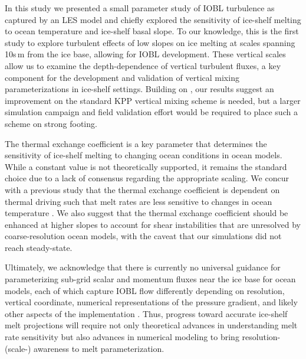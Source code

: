\documentclass[tc, manuscript]{copernicus}
\begin{document}
\conclusions

In this study we presented a small parameter study of IOBL turbulence as captured by an LES model and chiefly explored the sensitivity of ice-shelf melting to ocean temperature and ice-shelf basal slope. To our knowledge, this is the first study to explore turbulent effects of low slopes on ice melting at scales spanning 10s\,\unit{m} from the ice base, allowing for IOBL development. These vertical scales allow us to examine the depth-dependence of vertical turbulent fluxes, a key component for the development and validation of vertical mixing parameterizations in ice-shelf settings. Building on \citet{jenkins_shear_2021}, our results suggest an improvement on the standard KPP vertical mixing scheme is needed, but a larger simulation campaign and field validation effort would be required to place such a scheme on strong footing. 

The thermal exchange coefficient is a key parameter that determines the sensitivity of ice-shelf melting to changing ocean conditions in ocean models. While a constant value is not theoretically supported, it remains the standard choice due to a lack of consensus regarding the appropriate scaling. We concur with a previous study that the thermal exchange coefficient is dependent on thermal driving such that melt rates are less sensitive to changes in ocean temperature \citep{vreugdenhil_stratification_2019}. We also suggest that the thermal exchange coefficient should be enhanced at higher slopes to account for shear instabilities that are unresolved by coarse-resolution ocean models, with the caveat that our simulations did not reach steady-state. 

Ultimately, we acknowledge that there is currently no universal guidance for parameterizing sub-grid scalar and momentum fluxes near the ice base for ocean models, each of which capture IOBL flow differently depending on resolution, vertical coordinate, numerical representations of the pressure gradient, and likely other aspects of the implementation \citep{gwyther_cold_2020}. Thus, progress toward accurate ice-shelf melt projections will require not only theoretical advances in understanding melt rate sensitivity but also advances in numerical modeling to bring resolution- (scale-) awareness to melt parameterization.


\end{document}
